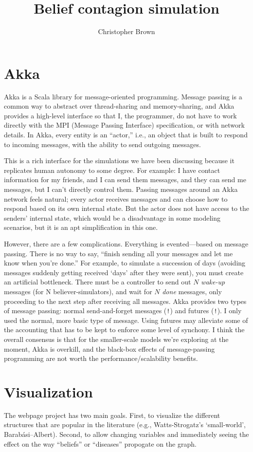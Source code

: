 \documentclass[11pt]{article}
\author{Christopher Brown}
\title{Belief contagion simulation}
\begin{document}
\maketitle

\section{Akka}

Akka is a Scala library for message-oriented programming. Message passing is a common way to abstract over thread-sharing and memory-sharing, and Akka provides a high-level interface so that I, the programmer, do not have to work directly with the MPI (Message Passing Interface) specification, or with network details. In Akka, every entity is an ``actor,'' i.e., an object that is built to respond to incoming messages, with the ability to send outgoing messages.

This is a rich interface for the simulations we have been discussing because it replicates human autonomy to some degree. For example: I have contact information for my friends, and I can send them messages, and they can send me messages, but I can't directly control them. Passing messages around an Akka network feels natural; every actor receives messages and can choose how to respond based on its own internal state. But the actor does not have access to the senders' internal state, which would be a disadvantage in some modeling scenarios, but it is an apt simplification in this one.

However, there are a few complications. Everything is evented---based on message passing. There is no way to say, ``finish sending all your messages and let me know when you're done.'' For example, to simulate a succession of days (avoiding messages suddenly getting received `days' after they were sent), you must create an artificial bottleneck. There must be a controller to send out $N$ \emph{wake-up} messages (for N believer-simulators), and wait for $N$ \emph{done} messages, only proceeding to the next step after receiving all messages.
Akka provides two types of message passing: normal send-and-forget messages (\texttt{!}) and futures (\texttt{!}).
I only used the normal, more basic type of message. Using futures may alleviate some of the accounting that has to be kept to enforce some level of synchony. I think the overall consensus is that for the smaller-scale models we're exploring at the moment, Akka is overkill, and the black-box effects of message-passing programming are not worth the performance/scalability benefits.

\section{Visualization}

The webpage project has two main goals. First, to visualize the different structures that are popular in the literature (e.g., Watts-Strogatz's `small-world', Barab\'asi–Albert). Second, to allow changing variables and immediately seeing the effect on the way ``beliefs'' or ``diseases'' propogate on the graph.
\end{document}
